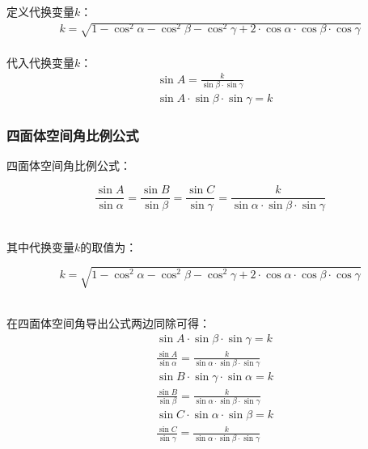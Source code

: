 \documentclass[UTF8]{ctexart}
\begin{document}
\newpage

    定义代换变量$k$：
    \begin{align}
        k=\sqrt{1-\cos^2{\alpha}-\cos^2{\beta}-\cos^2{\gamma}+2\cdot\cos{\alpha}\cdot\cos{\beta}\cdot\cos{\gamma}}
    \end{align}\\
    代入代换变量$k$：
    \begin{align}
        &\sin{A}=\frac{k}{\sin{\beta}\cdot\sin{\gamma}}\\[3mm]
        &\sin{A}\cdot\sin{\beta}\cdot\sin{\gamma}=k
    \end{align}\vspace{5pt}

\subsubsection{四面体空间角比例公式}
    四面体空间角比例公式：
    \begin{large}
        \begin{equation*}
            \frac{\sin{A}}{\sin{\alpha}}=\frac{\sin{B}}{\sin{\beta}}=\frac{\sin{C}}{\sin{\gamma}}=\frac{k}{\sin{\alpha}\cdot\sin{\beta}\cdot\sin{\gamma}}
        \end{equation*}
    \end{large}\\
    其中代换变量$k$的取值为：\vspace{5pt}
    \begin{large}
        \begin{equation*}
            k=\sqrt{1-\cos^2{\alpha}-\cos^2{\beta}-\cos^2{\gamma}+2\cdot\cos{\alpha}\cdot\cos{\beta}\cdot\cos{\gamma}}
        \end{equation*}
    \end{large}\\
    在四面体空间角导出公式两边同除可得：\vspace{5pt}
    \setcounter{equation}{0}
    \begin{align}
        &\sin{A}\cdot\sin{\beta}\cdot\sin{\gamma}=k\\[3mm]
        &\frac{\sin{A}}{\sin{\alpha}}=\frac{k}{\sin{\alpha}\cdot\sin{\beta}\cdot\sin{\gamma}}\\[8mm]
        &\sin{B}\cdot\sin{\gamma}\cdot\sin{\alpha}=k\\[3mm]
        &\frac{\sin{B}}{\sin{\beta}}=\frac{k}{\sin{\alpha}\cdot\sin{\beta}\cdot\sin{\gamma}}\\[8mm]
        &\sin{C}\cdot\sin{\alpha}\cdot\sin{\beta}=k\\[3mm]
        &\frac{\sin{C}}{\sin{\gamma}}=\frac{k}{\sin{\alpha}\cdot\sin{\beta}\cdot\sin{\gamma}}
    \end{align}
    

    
\end{document}

